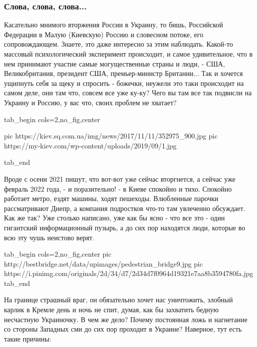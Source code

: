  
 
 
 
 
\clearpage
\subsubsection{Слова, слова, слова...}

Касательно мнимого вторжения России в Украину, то бишь, Российской Федерации в
Малую (Киевскую) Россию и словесном потоке, его сопровождающем.  Знаете, это
даже интересно за этим наблюдать. Какой-то массовый психологический эксперимент
происходит, и самое удивительное, что в нем принимают участие самые
могущественные страны и люди, - США, Великобритания, президент США,
премьер-министр Британии... Так и хочется ущипнуть себя за щеку и спросить -
божечки, неужели это таки происходит на самом деле, они там что, совсем все уже
ку-ку? Чего вы там все так подвисли на Украину и Россию, у вас что, своих
проблем не хватает?

\ifcmt
  tab_begin cols=2,no_fig,center

     pic https://kiev.sq.com.ua/img/news/2017/11/11/352975_900.jpg
     pic https://my-kiev.com/wp-content/uploads/2019/09/1.jpg

  tab_end
\fi

Вроде с осени 2021 пишут, что вот-вот уже сейчас вторгнется, а сейчас уже
февраль 2022 года, - и поразительно! - в Киеве спокойно и тихо. Спокойно
работает метро, ездят машины, ходят пешеходы. Влюбленные парочки рассматривают
Днепр, а компания подростков что-то там увлеченно обсуждает.  Как же так? Уже
столько написано, уже как бы ясно - что все это - один гигантский
информационный пузырь, а до сих пор находятся люди, которые во всю эту чушь
неистово верят. 

\ifcmt
  tab_begin cols=2,no_fig,center
     pic http://bestbridge.net/data/upimages/pedestrian_bridge9.jpg
     pic https://i.pinimg.com/originals/2d/34/d7/2d34d7f0964d19321e7aa8b3594780fa.jpg
  tab_end
\fi

На границе страшный враг, он обязательно хочет нас уничтожить, злобный карлик в
Кремле день и ночь не спит, думая, как бы захватить бедную несчастную
Украиночку. В чем же дело?  Почему постоянная ложь и нагнетание со стороны
Западных сми до сих пор проходит в Украине? Наверное, тут есть такие причины:

